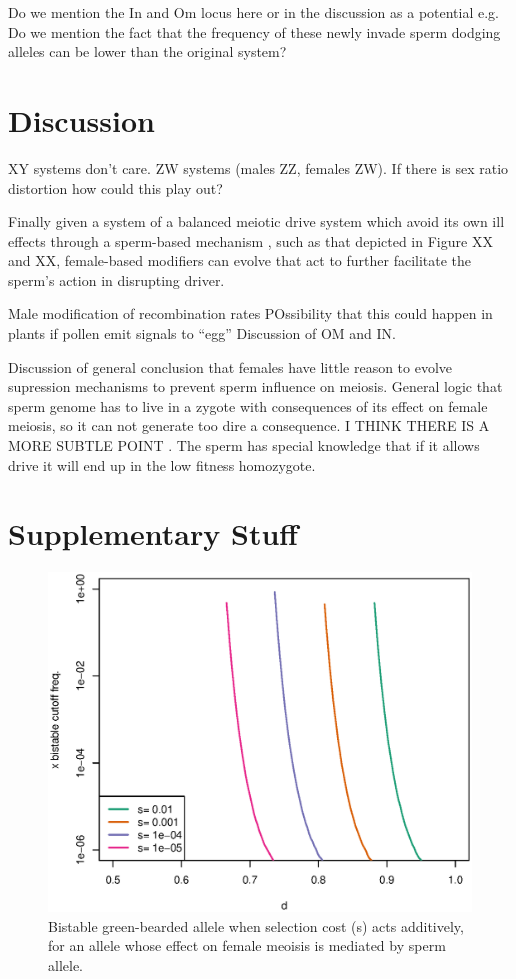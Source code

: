 \documentclass[12pt,letterpaper]{article}
\newcommand{\gc}[1]{{ \color{red} #1}}
\begin{document}
\gc{Do we mention the In and Om locus here or in the discussion as a
	 potential e.g. Do we mention the fact that the frequency of these
	 newly invade sperm dodging alleles can be lower than the original system?}\\

\section*{Discussion}



XY systems don't care. ZW systems (males ZZ, females ZW). If there is
sex ratio distortion how could this play out?

Finally given a system of a balanced meiotic drive system which avoid
its own ill effects through a sperm-based mechanism
, such as that depicted in Figure XX and XX, female-based modifiers 
can evolve that act to further facilitate the sperm's action in
disrupting driver. 

 Male modification of recombination rates
POssibility that this could happen in plants if pollen emit signals to ``egg''
Discussion of OM and IN.

Discussion of general conclusion that females have little reason to evolve supression mechanisms to prevent sperm influence on meiosis. 
General logic that sperm genome has to live in a zygote with consequences of its effect on female meiosis, so
it can not generate too dire a consequence.
I THINK THERE IS A MORE SUBTLE POINT . The sperm has special knowledge
that if it allows drive it will end up in the low fitness homozygote. 



\section*{Supplementary Stuff}

\begin{figure}
\includegraphics[width = 0.8 \textwidth]{Figures/bistable_x_vs_d_additive_s.eps} 
\caption{Bistable green-bearded allele when selection cost (s) acts
  additively, for an allele whose effect
 on female meoisis is mediated by sperm allele. }  \label{bistable_additive}
\end{figure}
\end{document}

